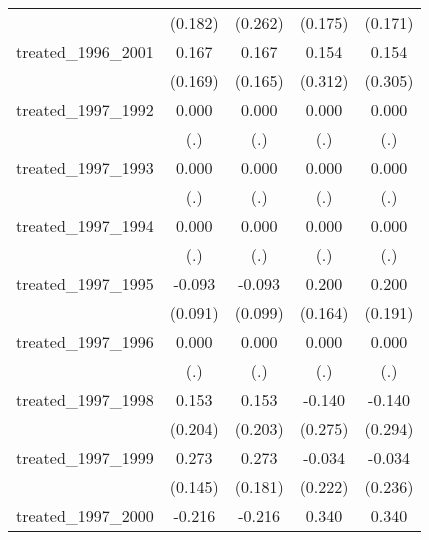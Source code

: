 {\begin{tabular}{l*{4}{c}}
            &     (0.182)         &     (0.262)         &     (0.175)         &     (0.171)         \\
[1em]
treated\_1996\_2001&       0.167         &       0.167         &       0.154         &       0.154         \\
            &     (0.169)         &     (0.165)         &     (0.312)         &     (0.305)         \\
[1em]
treated\_1997\_1992&       0.000         &       0.000         &       0.000         &       0.000         \\
            &         (.)         &         (.)         &         (.)         &         (.)         \\
[1em]
treated\_1997\_1993&       0.000         &       0.000         &       0.000         &       0.000         \\
            &         (.)         &         (.)         &         (.)         &         (.)         \\
[1em]
treated\_1997\_1994&       0.000         &       0.000         &       0.000         &       0.000         \\
            &         (.)         &         (.)         &         (.)         &         (.)         \\
[1em]
treated\_1997\_1995&      -0.093         &      -0.093         &       0.200         &       0.200         \\
            &     (0.091)         &     (0.099)         &     (0.164)         &     (0.191)         \\
[1em]
treated\_1997\_1996&       0.000         &       0.000         &       0.000         &       0.000         \\
            &         (.)         &         (.)         &         (.)         &         (.)         \\
[1em]
treated\_1997\_1998&       0.153         &       0.153         &      -0.140         &      -0.140         \\
            &     (0.204)         &     (0.203)         &     (0.275)         &     (0.294)         \\
[1em]
treated\_1997\_1999&       0.273         &       0.273         &      -0.034         &      -0.034         \\
            &     (0.145)         &     (0.181)         &     (0.222)         &     (0.236)         \\
[1em]
treated\_1997\_2000&      -0.216         &      -0.216         &       0.340         &       0.340         \\

\end{tabular}}
